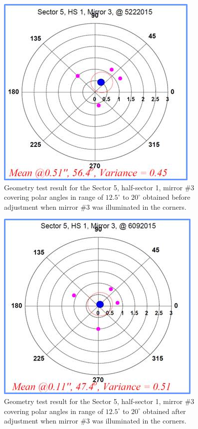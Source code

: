 \begin{figure}[ht]
    \centering
    \includegraphics[width=1.0\linewidth,trim={0 0cm 0 0},clip]{images/Ch_5_1_3_Before.jpg}
    \caption{Geometry test result for the Sector 5, half-sector 1, mirror \#3 covering polar angles in range of $12.5^\circ$ to $20^\circ$ obtained before adjustment when mirror \#3 was illuminated in the corners.}
    \label{fig:Ch_5_1_3_Before}
\end{figure}

\begin{figure}[ht]
    \centering
    \includegraphics[width=1.0\linewidth,trim={0 0cm 0 0},clip]{images/Ch_5_1_3_After.jpg}
    \caption{Geometry test result for the Sector 5, half-sector 1, mirror \#3 covering polar angles in range of $12.5^\circ$ to $20^\circ$ obtained after adjustment when mirror \#3 was illuminated in the corners.}
    \label{fig:Ch_5_1_3_After}
\end{figure}

